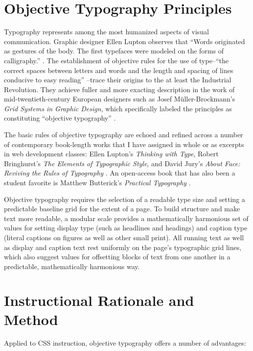 \documentclass[sigconf,sigplan,review,anonymous]{acmart}
\begin{document}
\section{Objective Typography Principles}

Typography represents among the most humanized aspects of visual communication. Graphic designer Ellen Lupton observes that “Words originated as gestures of the body. The first typefaces were modeled on the forms of calligraphy.” \cite[p.~13]{el:type}. The establishment of objective rules for the use of type--“the correct spaces between letters and words and the length and spacing of lines conducive to easy reading” \cite[p.~19]{mb:grid}--trace their origins to the at least the Industrial Revolution. They achieve fuller and more exacting description in the work of mid-twentieth-century European designers such as Josef Müller-Brockmann’s {\itshape Grid Systems in Graphic Design}, which specifically labeled the principles as constituting “objective typography” \cite[p.~7]{mb:grid}.

The basic rules of objective typography are echoed and refined across a number of contemporary book-length works that I have assigned in whole or as excerpts in web development classes: Ellen Lupton’s {\itshape Thinking with Type}, Robert Bringhurst’s {\itshape The Elements of Typographic Style}, and David Jury’s {\itshape About Face: Reviving the Rules of Typography} \cite{el:type,rb:style,dj:face}. An open-access book that has also been a student favorite is Matthew Butterick’s {\itshape Practical Typography} \cite{mb:pt}.

Objective typography requires the selection of a readable type size and setting a predictable baseline grid for the extent of a page. To build structure and make text more readable, a modular scale provides a mathematically harmonious set of values for setting display type (such as headlines and headings) and caption type (literal captions on figures as well as other small print). All running text as well as display and caption text rest uniformly on the page’s typographic grid lines, which also suggest values for offsetting blocks of text from one another in a predictable, mathematically harmonious way.

\section{Instructional Rationale and Method}

Applied to CSS instruction, objective typography offers a number of advantages:
\end{document}
